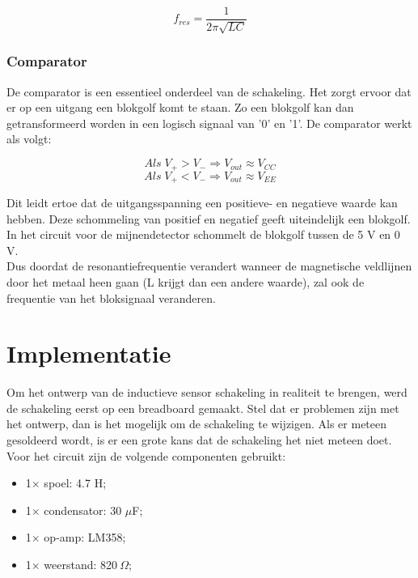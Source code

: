 \documentclass{report}
\begin{document}
\begin{equation}
f_{res}=\frac{1}{2\pi\sqrt{LC}}
\end{equation}

\subsubsection{Comparator}
De comparator is een essentieel onderdeel van de schakeling. Het zorgt ervoor dat er op een uitgang een blokgolf komt te staan. Zo een blokgolf kan dan getransformeerd worden in een logisch signaal van '0' en '1'. De comparator werkt als volgt:

\begin{equation}
Als \;V_+>V_- \Rightarrow V_{out}\approx V_{CC}
\end{equation}
\begin{equation}
Als \; V_+<V_- \Rightarrow V_{out}\approx V_{EE}
\end{equation}

Dit leidt ertoe dat de uitgangsspanning een positieve- en negatieve waarde kan hebben. Deze schommeling van positief en negatief geeft uiteindelijk een blokgolf. In het circuit voor de mijnendetector schommelt de blokgolf tussen de 5 V en 0 V.\\

Dus doordat de resonantiefrequentie verandert wanneer de magnetische veldlijnen door het metaal heen gaan (L krijgt dan een andere waarde), zal ook de frequentie van het bloksignaal veranderen. 

\section{Implementatie}
Om het ontwerp van de inductieve sensor schakeling in realiteit te brengen, werd de schakeling eerst op een breadboard gemaakt. Stel dat er problemen zijn met het ontwerp, dan is het mogelijk om de schakeling te wijzigen. Als er meteen gesoldeerd wordt, is er een grote kans dat de schakeling het niet meteen doet.\\ 

\noindent Voor het circuit zijn de volgende componenten gebruikt:
\begin{itemize}
\item 1$\times$ spoel: 4.7 H;
\item 1$\times$ condensator: 30 $\mu$F;
\item 1$\times$ op-amp: LM358;
\item 1$\times$ weerstand: 820$\: \Omega$;
\end{itemize}
\end{document}
